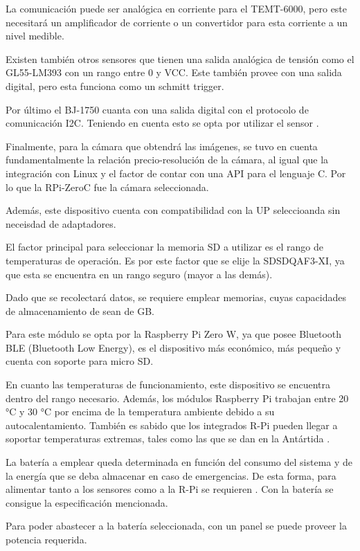 La comunicación puede ser analógica en corriente para el TEMT-6000, pero este necesitará un amplificador de corriente o un convertidor para esta corriente a un nivel medible.

Existen también otros sensores que tienen una salida analógica de tensión como el GL55-LM393 con un rango entre 0 y VCC. Este también provee con una salida digital, pero esta funciona como un schmitt trigger.

Por último el BJ-1750 cuanta con una salida digital con el protocolo de comunicación I2C. Teniendo en cuenta esto se opta por utilizar el sensor \TBD.


Finalmente, para la cámara que obtendrá las imágenes, se tuvo en cuenta fundamentalmente la relación precio-resolución de la cámara, al igual que la integración con Linux y el factor de contar con una API para el lenguaje C. Por lo que la RPi-ZeroC fue la cámara seleccionada.

Además, este dispositivo cuenta con compatibilidad con la UP seleccioanda sin neceisdad de adaptadores.


El factor principal para seleccionar la memoria SD a utilizar es el rango de temperaturas de operación. Es por este factor que se elije la SDSDQAF3-XI, ya que esta se encuentra en un rango seguro (mayor a las demás).

Dado que se recolectará \TBD datos, se requiere emplear \TBD memorias, cuyas capacidades de almacenamiento de sean de \TBD GB.


\TBD
{}


Para este módulo se opta por la Raspberry Pi Zero W, ya que posee Bluetooth BLE (Bluetooth Low Energy), es el dispositivo más económico, más pequeño y cuenta con soporte para micro SD.

En cuanto las temperaturas de funcionamiento, este dispositivo se encuentra dentro del rango necesario. Además, los módulos Raspberry Pi trabajan entre 20 °C y 30 °C por encima de la temperatura ambiente debido a su autocalentamiento. También es sabido que los integrados R-Pi pueden llegar a soportar temperaturas extremas, tales como las que se dan en la Antártida \cite{ref:Penguin}.


La batería a emplear queda determinada en función del consumo del sistema y de la energía que se deba almacenar en caso de emergencias. De esta forma, para alimentar tanto a los sensores como a la R-Pi se requieren \TBD. Con la batería \TBD se consigue la especificación mencionada.


\TBD


Para poder abastecer a la batería seleccionada, con un panel \TBD se puede proveer la potencia requerida.